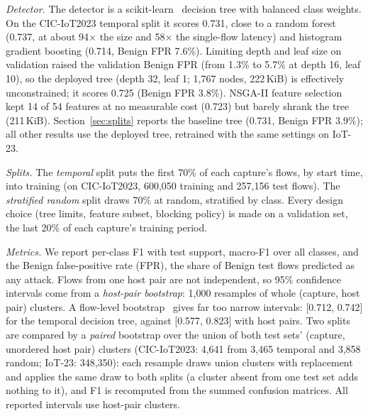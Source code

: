 \emph{Detector.} The detector is a scikit-learn~\cite{pedregosa2011sklearn} decision tree with balanced class weights. On the CIC-IoT2023 temporal split it scores 0.731, close to a random forest (0.737, at about 94$\times$ the size and 58$\times$ the single-flow latency) and histogram gradient boosting (0.714, Benign FPR 7.6\%). Limiting depth and leaf size on validation raised the validation Benign FPR (from 1.3\% to 5.7\% at depth 16, leaf 10), so the deployed tree (depth 32, leaf 1; 1,767 nodes, 222\,KiB) is effectively unconstrained; it scores 0.725 (Benign FPR 3.8\%). NSGA-II feature selection~\cite{deb2002nsga2,blank2020pymoo} kept 14 of 54 features at no measurable cost (0.723) but barely shrank the tree (211\,KiB). Section~\ref{sec:splits} reports the baseline tree (0.731, Benign FPR 3.9\%); all other results use the deployed tree, retrained with the same settings on IoT-23.

\emph{Splits.} The \emph{temporal} split puts the first 70\% of each capture's flows, by start time, into training (on CIC-IoT2023, 600,050 training and 257,156 test flows). The \emph{stratified random} split draws 70\% at random, stratified by class. Every design choice (tree limits, feature subset, blocking policy) is made on a validation set, the last 20\% of each capture's training period.

\emph{Metrics.} We report per-class F1 with test support, macro-F1 over all classes, and the Benign false-positive rate (FPR), the share of Benign test flows predicted as any attack. Flows from one host pair are not independent, so 95\% confidence intervals come from a \emph{host-pair bootstrap}: 1,000 resamples of whole (capture, host pair) clusters. A flow-level bootstrap~\cite{efron1994bootstrap} gives far too narrow intervals: [0.712, 0.742] for the temporal decision tree, against [0.577, 0.823] with host pairs. Two splits are compared by a \emph{paired} bootstrap over the union of both test sets' (capture, unordered host pair) clusters (CIC-IoT2023: 4,641 from 3,465 temporal and 3,858 random; IoT-23: 348,350): each resample draws union clusters with replacement and applies the same draw to both splits (a cluster absent from one test set adds nothing to it), and F1 is recomputed from the summed confusion matrices. All reported intervals use host-pair clusters.
